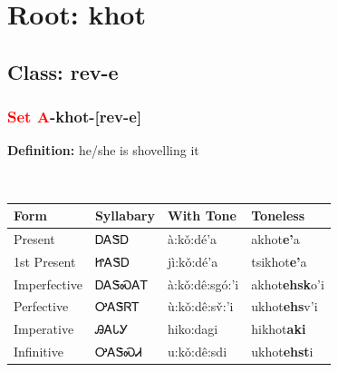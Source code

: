 \needspace{4in}
\section*{Root: khot}
\nopagebreak
{}
\needspace{3in}
\subsection*{Class: rev-e}
\nopagebreak
\needspace{2in}
\subsubsection*{\textcolor{Red}{Set A}{-}\textbf{khot}{-}[rev-e]}
\nopagebreak
\textbf{Definition: } he/she is shovelling it
\\[0.5em]
\begin{tabularx}{\textwidth}{l X X X}%
\toprule%
\textbf{Form}&\textbf{Syllabary}&\textbf{With Tone}&\textbf{Toneless}\\%
\midrule%
Present&ᎠᎪᏕᎠ&à:kǒ:dé’a&akhot\textbf{e'}a\\%
1st Present&ᏥᎪᏕᎠ&jì:kǒ:dé’a&tsikhot\textbf{e'}a\\%
Imperfective&ᎠᎪᏕᏍᎪᎢ&à:kǒ:dê:sgó:’i&akhot\textbf{ehsk}o'i\\%
Perfective&ᎤᎪᏕᏒᎢ&ù:kǒ:dê:sv̌:’i&ukhot\textbf{ehs}v'i\\%
Imperative&ᎯᎪᏓᎩ&hiko:dagi&hikhot\textbf{aki}\\%
Infinitive&ᎤᎪᏕᏍᏗ&u:kǒ:dê:sdi&ukhot\textbf{ehst}i\\%
\bottomrule%
\end{tabularx}
\\[1em]